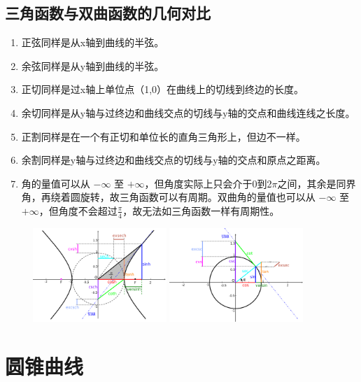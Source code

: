 \documentclass{book}
\numberwithin{equation}{section}
\numberwithin{figure}{section}
\theoremstyle{definition}
\begin{document}
\subsection{三角函数与双曲函数的几何对比}
\begin{enumerate}
  \item 正弦同样是从x轴到曲线的半弦。
  \item 余弦同样是从y轴到曲线的半弦。
  \item 正切同样是过x轴上单位点（1,0）在曲线上的切线到终边的长度。
  \item 余切同样是从y轴与过终边和曲线交点的切线与y轴的交点和曲线连线之长度。
  \item 正割同样是在一个有正切和单位长的直角三角形上，但边不一样。
  \item 余割同样是y轴与过终边和曲线交点的切线与y轴的交点和原点之距离。
  \item 角的量值可以从 $-\infty$ 至 $+\infty$，但角度实际上只会介于0到2$\pi$之间，其余是同界角，再绕着圆旋转，故三角函数可以有周期。双曲角的量值也可以从 $-\infty$ 至 $+\infty$，但角度不会超过$\frac{\pi}{4}$，故无法如三角函数一样有周期性。
\end{enumerate}
\begin{figure}[htb]
  \centering
  \includegraphics[width=0.45\textwidth]{files/hyperbolic_functions_all}
  \includegraphics[width=0.45\textwidth]{files/trigonometric_functions_all}
  \caption{}
\end{figure}
\section{圆锥曲线}
\end{document}
